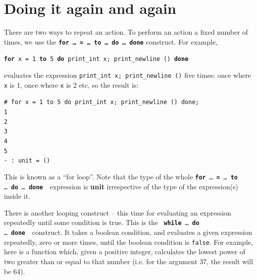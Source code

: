 \documentclass[]{book}
\newcommand{\pfor}{\textbf{for}\xspace}
\newcommand{\pto}{\textbf{to}\xspace}
\newcommand{\pdo}{\textbf{do}\xspace}
\newcommand{\pdone}{\textbf{done}\xspace}
\newcommand{\smspace}{\vspace{4mm}}
\begin{document}
\section*{Doing it again and again}

There are two ways to repeat an action. To perform an action a fixed number of times, we use the \texttt{\textbf{for\! \ldots\ \!= \!\ldots\ \!to \ldots\ \!do \ldots\ \!done}} construct. For example,  

\smspace
  \texttt{\pfor x = 1 \pto 5 \pdo print\_int x; print\_newline () \pdone}
\smspace

\noindent evaluates the expression \texttt{print\_int\! x;\! print\_newline\! ()} five times: once where \texttt{x} is 1, once where \texttt{x} is 2 etc, so the result is:

\smspace
\noindent\verb$# for x = 1 to 5 do print_int x; print_newline () done;$\\
\noindent\verb!1!\\
\noindent\verb!2!\\
\noindent\verb!3!\\
\noindent\verb!4!\\
\noindent\verb!5!\\
\noindent\verb!- : unit = ()!
\smspace

\noindent This is known as a ``for loop''. Note that the type of the whole \texttt{\textbf{for}\! \ldots\ \!\textbf{=} \!\ldots\ \!\textbf{to} \!\ldots\ \!\textbf{do} \!\ldots\ \!\textbf{done}}\ \ expression is \textbf{\textrm{unit}} irrespective of the type of the expression(s) inside it.

There is another looping construct -- this time for evaluating an expression
repeatedly until some condition is true. This is the \
\texttt{\textbf{while}\!
\ldots\ \!\textbf{do}\! \ldots\ \!\textbf{done}}\ \ construct. It takes a
boolean condition, and evaluates a given expression repeatedly, zero or more
times, until the boolean condition is \texttt{false}. For example, here is a function which, given a positive integer, calculates the lowest power of two greater than or equal to that number (i.e. for the argument 37, the result will be 64).
\end{document}
